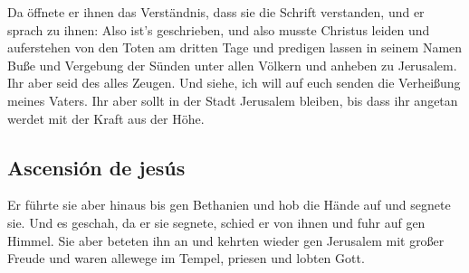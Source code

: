  Da öffnete er ihnen das Verständnis, dass sie die
Schrift verstanden,  und er sprach zu ihnen: Also ist's
geschrieben, und also musste Christus leiden und auferstehen von den
Toten am dritten Tage  und predigen lassen in seinem
Namen Buße und Vergebung der Sünden unter allen Völkern und anheben zu
Jerusalem.  Ihr aber seid des alles Zeugen.
 Und siehe, ich will auf euch senden die Verheißung
meines Vaters. Ihr aber sollt in der Stadt Jerusalem bleiben, bis dass
ihr angetan werdet mit der Kraft aus der Höhe.

\hypertarget{ascensiuxf3n-de-jesuxfas}{%
\subsection{Ascensión de jesús}\label{ascensiuxf3n-de-jesuxfas}}

 Er führte sie aber hinaus bis gen Bethanien und hob die
Hände auf und segnete sie.  Und es geschah, da er sie
segnete, schied er von ihnen und fuhr auf gen Himmel. 
Sie aber beteten ihn an und kehrten wieder gen Jerusalem mit großer
Freude  und waren allewege im Tempel, priesen und lobten
Gott.
